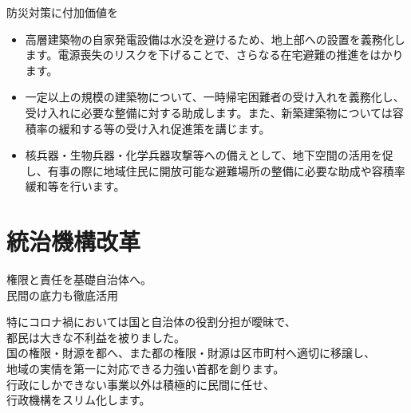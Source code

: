\documentclass[dvipdfmx]{beamer}
\begin{document}
    \begin{frame}{防災対策に付加価値を}{}
        \begin{small}
            \begin{itemize}
                \setlength{\itemsep}{2mm}
                \item 高層建築物の自家発電設備は水没を避けるため、地上部への設置を義務化します。電源喪失のリスクを下げることで、さらなる在宅避難の推進をはかります。
                \item 一定以上の規模の建築物について、一時帰宅困難者の受け入れを義務化し、受け入れに必要な整備に対する助成します。また、新築建築物については容積率の緩和する等の受け入れ促進策を講じます。
                \item 核兵器・生物兵器・化学兵器攻撃等への備えとして、地下空間の活用を促し、有事の際に地域住民に開放可能な避難場所の整備に必要な助成や容積率緩和等を行います。
            \end{itemize}
        \end{small}
    \end{frame}

\section{統治機構改革}
    \begin{frame}
        \sectionpage
        \begin{center}
            \begin{large}
                \alert{権限と責任を基礎自治体へ。}\\\alert{民間の底力も徹底活用}
            \end{large}
        \end{center}
        \begin{small}
            特にコロナ禍においては国と自治体の役割分担が曖昧で、\\
            都民は大きな不利益を被りました。\\
            国の権限・財源を都へ、また都の権限・財源は区市町村へ適切に移譲し、\\
            地域の実情を第一に対応できる力強い首都を創ります。\\
            行政にしかできない事業以外は積極的に民間に任せ、\\
            行政機構をスリム化します。
        \end{small}
    \end{frame}
\end{document}
